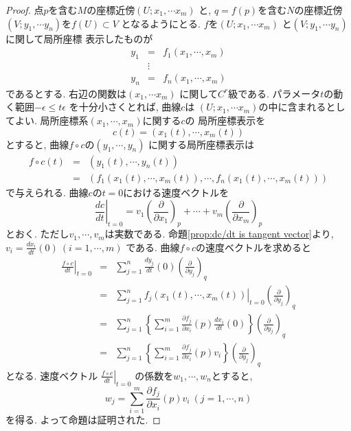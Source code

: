 \documentclass[a4j,12pt]{jarticle}
\theoremstyle{definition}
\begin{document}
\begin{proof}
    点$p$を含む$M$の座標近傍$(U;x_1,\cdots x_m)$
    と, $q=f(p)$を含む$N$の座標近傍
    $(V;y_1,\cdots y_n)$を$f(U)\subset V$
    となるようにとる. $f$を$(U;x_1,\cdots x_m)$
    と$(V;y_1,\cdots y_n)$に関して局所座標
    表示したものが
    \begin{eqnarray*}
        y_1&=&f_1(x_1,\cdots ,x_m)\\
        &\vdots& \\
        y_n&=&f_n(x_1,\cdots ,x_m)
    \end{eqnarray*}
    であるとする. 右辺の関数は$(x_1,\cdots x_m)$
    に関して$C^r$級である. 
    パラメータ$t$の動く範囲$-\epsilon\leq t \epsilon$
    を十分小さくとれば, 曲線$c$は
    $(U;x_1,\cdots x_m)$の中に含まれるとしてよい. 
    局所座標系$(x_1,\cdots ,x_m)$に関する$c$の
    局所座標表示を
    $$c(t)=(x_1(t),\cdots ,x_m(t))$$
    とすると, 曲線$f\circ c$の$(y_1,\cdots ,y_n)$
    に関する局所座標表示は
    \begin{eqnarray*}
        f\circ c(t)&=&(y_1(t),\cdots ,y_n(t))\\
        &=&(f_1(x_1(t),\cdots ,x_m(t)),\cdots ,
        f_n(x_1(t),\cdots ,x_m(t)))
    \end{eqnarray*}
    で与えられる. 
    曲線$c$の$t=0$における速度ベクトルを
    $$\left .\frac{dc}{dt}\right|_{t=0}=
    v_1\left(\frac{\partial}{\partial x_1}\right)_p
    +\cdots +
    v_m\left(\frac{\partial}{\partial x_m}\right)_p$$
    とおく. ただし$v_1,\cdots ,v_m$は実数である. 
    命題\ref{prop:dc/dt is tangent vector}より, 
    $v_i=\frac{dx_i}{dt}(0)\ (i=1,\cdots ,m)$
    である. 曲線$f\circ c$の速度ベクトルを求めると
    \begin{eqnarray*}
        \left .\frac{f\circ c}{dt}\right|_{t=0}
        &=&\sum_{j=1}^{n}\frac{dy_j}{dt}(0)
        \left(\frac{\partial}{\partial y_j}
        \right)_q\\
        &=&
        \sum_{j=1}^{n}\left .
        f_j(x_1(t),\cdots ,x_m(t))\right|_{t=0}
        \left(\frac{\partial}{\partial y_j}
        \right)_q\\
        &=&
        \sum_{j=1}^{n}\left\{
            \sum_{i=1}^{m}\frac{\partial f_j}
            {\partial x_i}(p)
            \frac{dx_i}{dt}(0)
        \right\}
        \left(\frac{\partial}{\partial y_j}
        \right)_q\\
        &=&
        \sum_{j=1}^{n}\left\{
            \sum_{i=1}^{m}\frac{\partial f_j}
            {\partial x_i}(p)
            v_i
        \right\}
        \left(\frac{\partial}{\partial y_j}
        \right)_q
    \end{eqnarray*}
    となる. 速度ベクトル
    $\left .\frac{f\circ c}{dt}\right|_{t=0}$
    の係数を$w_1, \cdots ,w_n$とすると, 
    $$w_j=\sum_{i=1}^{m}\frac{\partial f_j}
    {\partial x_i}(p)v_i\ (j=1,\cdots ,n)$$
    を得る. よって命題は証明された. 
\end{proof}
\end{document}
